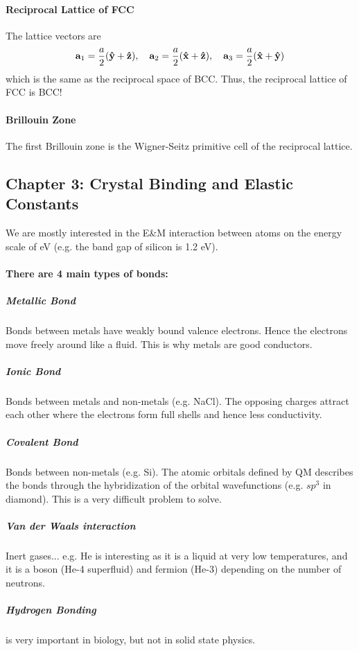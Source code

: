 \documentclass[../main.tex]{subfiles}
\begin{document}
\paragraph{Reciprocal Lattice of FCC} The lattice vectors are
\begin{align*}
    \vb{a}_1 = \frac{a}{2}(\vu{y} + \vu{z}), \quad
    \vb{a}_2 = \frac{a}{2}(\vu{x} + \vu{z}), \quad
    \vb{a}_3 = \frac{a}{2}(\vu{x} + \vu{y})
\end{align*}
which is the same as the reciprocal space of BCC. Thus, the reciprocal lattice of FCC is BCC!

\paragraph{Brillouin Zone} The first Brillouin zone is the Wigner-Seitz primitive cell of the
reciprocal lattice.

\subsection*{Chapter 3: Crystal Binding and Elastic Constants}

We are mostly interested in the E\&M interaction between atoms on the energy scale of eV (e.g. the
band gap of silicon is 1.2 eV). 

\paragraph{There are 4 main types of bonds:}

\subparagraph*{Metallic Bond} Bonds between metals have weakly bound valence electrons. Hence the
electrons move freely around like a fluid. This is why metals are good conductors.

\subparagraph*{Ionic Bond} Bonds between metals and non-metals (e.g. NaCl). The opposing charges
attract each other where the electrons form full shells and hence less conductivity.

\subparagraph*{Covalent Bond} Bonds between non-metals (e.g. Si). The atomic orbitals defined by
QM describes the bonds through the hybridization of the orbital wavefunctions (e.g. $sp^3$ in
diamond). This is a very difficult problem to solve.

\subparagraph*{Van der Waals interaction} Inert gases... e.g. He is interesting as it is a liquid at
very low temperatures, and it is a boson (He-4 superfluid) and fermion (He-3) depending on the
number of neutrons. 

\subparagraph*{Hydrogen Bonding} is very important in biology, but not in solid state physics.
\end{document}
